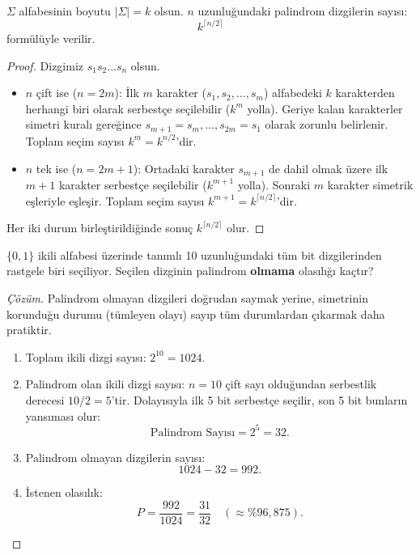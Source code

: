 \begin{theorem}
$\Sigma$ alfabesinin boyutu $|\Sigma| = k$ olsun. $n$ uzunluğundaki palindrom dizgilerin sayısı:
\[
k^{\lceil n / 2 \rceil}
\]
formülüyle verilir.
\end{theorem}

\begin{proof}
Dizgimiz $s_1 s_2 \dots s_n$ olsun.
\begin{itemize}
    \item $n$ çift ise ($n = 2m$): İlk $m$ karakter ($s_1, s_2, \dots, s_m$) alfabedeki $k$ karakterden herhangi biri olarak serbestçe seçilebilir ($k^m$ yolla). Geriye kalan karakterler simetri kuralı gereğince $s_{m+1} = s_m, \dots, s_{2m} = s_1$ olarak zorunlu belirlenir. Toplam seçim sayısı $k^m = k^{n/2}$'dir.
    \item $n$ tek ise ($n = 2m + 1$): Ortadaki karakter $s_{m+1}$ de dahil olmak üzere ilk $m+1$ karakter serbestçe seçilebilir ($k^{m+1}$ yolla). Sonraki $m$ karakter simetrik eşleriyle eşleşir. Toplam seçim sayısı $k^{m+1} = k^{\lceil n/2 \rceil}$'dir.
\end{itemize}

Her iki durum birleştirildiğinde sonuç $k^{\lceil n/2 \rceil}$ olur.
\end{proof}

\begin{example}
$\{0, 1\}$ ikili alfabesi üzerinde tanımlı 10 uzunluğundaki tüm bit dizgilerinden rastgele biri seçiliyor. Seçilen dizginin palindrom \textbf{olmama} olasılığı kaçtır?
\end{example}

\begin{proof}[Çözüm]
Palindrom olmayan dizgileri doğrudan saymak yerine, simetrinin korunduğu durumu (tümleyen olayı) sayıp tüm durumlardan çıkarmak daha pratiktir.

\begin{enumerate}
    \item Toplam ikili dizgi sayısı: $2^{10} = 1024$.
\item Palindrom olan ikili dizgi sayısı: $n = 10$ çift sayı olduğundan serbestlik derecesi $10 / 2 = 5$'tir. 
Dolayısıyla ilk 5 bit serbestçe seçilir, son 5 bit bunların yansıması olur:
\[
\text{Palindrom Sayısı} = 2^5 = 32.
\]
\item Palindrom olmayan dizgilerin sayısı:
\[
1024 - 32 = 992.
\]
\item İstenen olasılık:
    \[
    P = \frac{992}{1024} = \frac{31}{32} \quad (\approx \%96{,}875).
    \]
\end{enumerate}
\end{proof}

